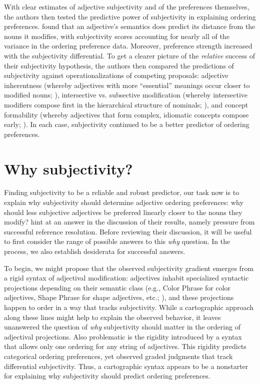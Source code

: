 \documentclass{sp}
\begin{document}
With clear estimates of adjective subjectivity and of the preferences themselves, the authors then tested the predictive power of subjectivity in explaining ordering preferences. 
\citeauthor{scontrasetal2017adjectives} found that an adjective's semantics does predict its distance from the nouns it modifies, with subjectivity scores accounting for nearly all of the variance in the ordering preference data. Moreover, preference strength increased with the subjectivity differential. To get a clearer picture of the \emph{relative} success of their subjectivity hypothesis, the authors then compared the predictions of subjectivity against operationalizations of competing proposals: adjective inherentness (whereby adjectives with more ``essential'' meanings occur closer to modified nouns; \citealp[e.g.,][]{whorf1945}), intersective vs. subsective modification (whereby intersective modifiers compose first in the hierarchical structure of nominals; \citealp{truswell2009}), and concept formability (whereby adjectives that form complex, idiomatic concepts compose early; \citealp[e.g.][]{mcnallyboleda2004}). In each case, subjectivity continued to be a better predictor of ordering preferences.


\section{Why subjectivity?} \label{why}

Finding subjectivity to be a reliable and robust predictor, our task now is to explain why subjectivity should determine adjective ordering preferences: why should less subjective adjectives be preferred linearly closer to the nouns they modify? \citeauthor{scontrasetal2017adjectives} hint at an answer in the discussion of their results, namely pressure from successful reference resolution. Before reviewing their discussion, it will be useful to first consider the range of possible answers to this \emph{why} question. In the process, we also establish desiderata for successful answers.

To begin, we might propose that the observed subjectivity gradient emerges from a rigid syntax of adjectival modification: adjectives inhabit specialized syntactic projections depending on their semantic class (e.g., Color Phrase for color adjectives, Shape Phrase for shape adjectives, etc.; \citealp{cinque1994,scott2002}), and these projections happen to order in a way that tracks subjectivity. While a cartographic approach along these lines might help to explain the observed behavior, it leaves unanswered the question of \emph{why} subjectivity should matter in the ordering of adjectival projections. Also problematic is the rigidity introduced by a syntax that allows only one ordering for any string of adjectives. This rigidity predicts categorical ordering preferences, yet \citeauthor{scontrasetal2017adjectives} observed graded judgments that track differential subjectivity. Thus, a cartographic syntax appears to be a nonstarter for explaining why subjectivity should predict ordering preferences.
\end{document}
